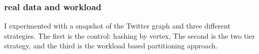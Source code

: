\documentclass[11pt]{article}
\begin{document}
\subsubsection{real data and workload}
I experimented with a snapshot of the Twitter graph and three different strategies. The first is the control:  hashing by vertex, 
The second is the two tier strategy, and the third is the workload based partitioning approach.


\newcommand{\gridscale}{2.1in}
\end{document}
